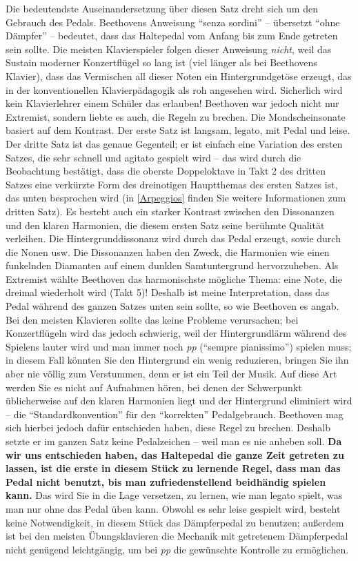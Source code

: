 Die bedeutendste Auseinandersetzung über diesen Satz dreht sich um den Gebrauch des Pedals.
Beethovens Anweisung \enquote{senza sordini} -- übersetzt \enquote{ohne Dämpfer} -- bedeutet, dass das Haltepedal vom Anfang bis zum Ende getreten sein sollte.
Die meisten Klavierspieler folgen dieser Anweisung \textit{nicht}, weil das Sustain moderner Konzertflügel so lang ist (viel länger als bei Beethovens Klavier), dass das Vermischen all dieser Noten ein Hintergrundgetöse erzeugt, das in der konventionellen Klavierpädagogik als roh angesehen wird.
Sicherlich wird kein Klavierlehrer einem Schüler das erlauben!
Beethoven war jedoch nicht nur Extremist, sondern liebte es auch, die Regeln zu brechen.
Die Mondscheinsonate basiert auf dem Kontrast.
Der erste Satz ist langsam, legato, mit Pedal und leise.
Der dritte Satz ist das genaue Gegenteil; er ist einfach eine Variation des ersten Satzes, die sehr schnell und agitato gespielt wird -- das wird durch die Beobachtung bestätigt, dass die oberste Doppeloktave in Takt 2 des dritten Satzes eine verkürzte Form des dreinotigen Hauptthemas des ersten Satzes ist, das unten besprochen wird (in \hyperref[Arpeggios]{\autoref{Arpeggios}} finden Sie weitere Informationen zum dritten Satz).
Es besteht auch ein starker Kontrast zwischen den Dissonanzen und den klaren Harmonien, die diesem ersten Satz seine berühmte Qualität verleihen.
Die Hintergrunddissonanz wird durch das Pedal erzeugt, sowie durch die Nonen usw.
Die Dissonanzen haben den Zweck, die Harmonien wie einen funkelnden Diamanten auf einem dunklen Samtuntergrund hervorzuheben.
Als Extremist wählte Beethoven das harmonischste mögliche Thema: eine Note, die dreimal wiederholt wird (Takt 5)!
Deshalb ist meine Interpretation, dass das Pedal während des ganzen Satzes unten sein sollte, so wie Beethoven es angab.
Bei den meisten Klavieren sollte das keine Probleme verursachen;
bei Konzertflügeln wird das jedoch schwierig, weil der Hintergrundlärm während des Spielens lauter wird und man immer noch \textit{pp} (\enquote{sempre pianissimo}) spielen muss; in diesem Fall könnten Sie den Hintergrund ein wenig reduzieren, bringen Sie ihn aber nie völlig zum Verstummen, denn er ist ein Teil der Musik.
Auf diese Art werden Sie es nicht auf Aufnahmen hören, bei denen der Schwerpunkt üblicherweise auf den klaren Harmonien liegt und der Hintergrund eliminiert wird -- die \enquote{Standardkonvention} für den \enquote{korrekten} Pedalgebrauch.
Beethoven mag sich hierbei jedoch dafür entschieden haben, diese Regel zu brechen.
Deshalb setzte er im ganzen Satz keine Pedalzeichen -- weil man es nie anheben soll.
\textbf{Da wir uns entschieden haben, das Haltepedal die ganze Zeit getreten zu lassen, ist die erste in diesem Stück zu lernende Regel, dass man das Pedal nicht benutzt, bis man zufriedenstellend beidhändig spielen kann.}
Das wird Sie in die Lage versetzen, zu lernen, wie man legato spielt, was man nur ohne das Pedal üben kann.
Obwohl es sehr leise gespielt wird, besteht keine Notwendigkeit, in diesem Stück das Dämpferpedal zu benutzen; außerdem ist bei den meisten Übungsklavieren die Mechanik mit getretenem Dämpferpedal nicht genügend leichtgängig, um bei \textit{pp} die gewünschte Kontrolle zu ermöglichen.


